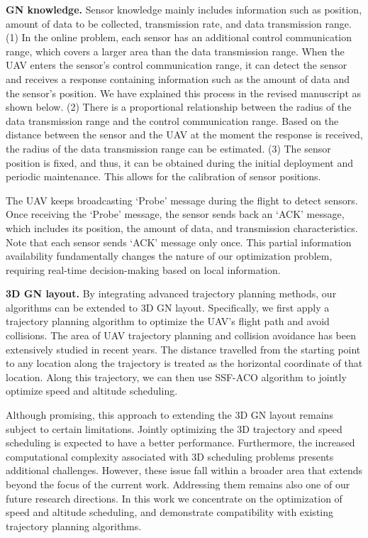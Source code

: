 \begin{metaresponse}
	\textbf{GN knowledge.}
	Sensor knowledge mainly includes information such as position, amount of data to be collected, transmission rate, and data transmission range.
	(1) In the online problem, each sensor has an additional control communication range, which covers a larger area than the data transmission range.
	When the UAV enters the sensor's control communication range, it can detect the sensor and receives a response containing information such as the amount of data and the sensor's position.
	We have explained this process in the revised manuscript as shown below.
	(2) There is a proportional relationship between the radius of the data transmission range and the control communication range.
	Based on the distance between the sensor and the UAV at the moment the response is received, the radius of the data transmission range can be estimated.
	(3) The sensor position is fixed, and thus, it can be obtained during the initial deployment and periodic maintenance. This allows for the calibration of sensor positions.
	\begin{changes}
		The UAV keeps broadcasting `Probe' message during the flight to detect sensors. Once receiving the `Probe' message, the sensor sends back an `ACK' message, which includes its position, the amount of data, and transmission characteristics. Note that each sensor sends `ACK' message only once. This partial information availability fundamentally changes the nature of our optimization problem, requiring real-time 
		decision-making based on local information.
	\end{changes}

	\textbf{3D GN layout.}
	By integrating advanced trajectory planning methods, our algorithms can be extended to 3D GN layout.
	Specifically, we first apply a trajectory planning algorithm to optimize the UAV's flight path and avoid collisions.
	The area of UAV trajectory planning and collision avoidance has been extensively studied in recent years.
	The distance travelled from the starting point to any location along the trajectory is treated as the horizontal coordinate of that location.
	Along this trajectory, we can then use SSF-ACO algorithm to jointly optimize speed and altitude scheduling.
	
	Although promising, this approach to extending the 3D GN layout remains subject to certain limitations.
	Jointly optimizing the 3D trajectory and speed scheduling is expected to have a better performance.
	Furthermore, the increased computational complexity associated with 3D scheduling problems presents additional challenges.
	However, these issue fall within a broader area that extends beyond the focus of the current work.
	Addressing them remains also one of our future research directions.
	In this work we concentrate on the optimization of speed and altitude scheduling, and demonstrate compatibility with existing trajectory planning algorithms.
\end{metaresponse}

